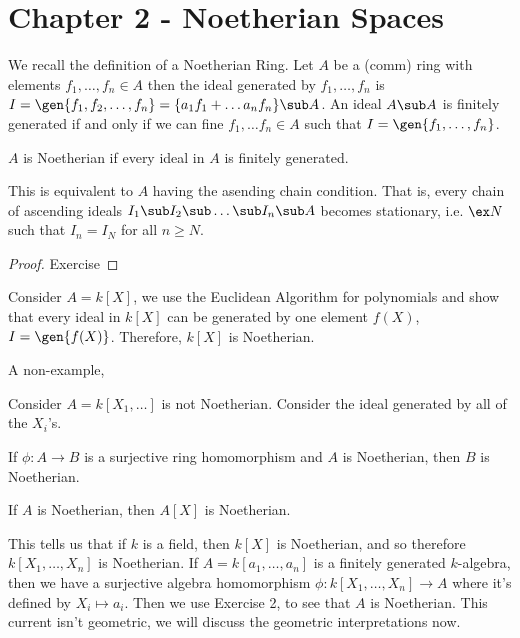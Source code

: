 
\section{Chapter 2 - Noetherian Spaces}
We recall the definition of a Noetherian Ring. Let $A$ be a (comm) ring with elements $f_1, \dots, f_n \in A$ then the ideal generated by $f_1, \dots, f_n$ is $I = \gen{ f_1, f_2, \dots, f_n} = \{a_1f_1 + \dots a_nf_n\} \sub A$. An ideal $A \sub A$ is finitely generated if and only if we can fine $f_1, \dots f_n \in A$ such that $I = \gen{f_1, \dots, f_n}$.
\begin{ndefi}
  $A$ is Noetherian if every ideal in $A$ is finitely generated.
\end{ndefi}

\noindent
This is equivalent to $A$ having the asending chain condition. That is, every chain of ascending ideals $I_1 \sub I_2 \sub \dots \sub I_n \sub A$ becomes stationary, i.e. $\ex N$ such that $I_n = I_N$ for all $n \ge N$.
\begin{proof}
  Exercise
\end{proof}

\begin{eg}
  Consider $A = k[X]$, we use the Euclidean Algorithm for polynomials and show that every ideal in $k[X]$ can be generated by one element $f(X)$, $I = \gen{f(X)}$. Therefore, $k[X]$ is Noetherian.
\end{eg}

\noindent
A non-example,
\begin{eg}
  Consider $A = k[X_1, \dots]$ is not Noetherian. Consider the ideal generated by all of the $X_i$'s.
\end{eg}

\begin{exercise}
  If $\phi : A \to B$ is a surjective ring homomorphism and $A$ is Noetherian, then $B$ is Noetherian.
\end{exercise}

\begin{nthm}
  If $A$ is Noetherian, then $A[X]$ is Noetherian.
\end{nthm}
\noindent
This tells us that if $k$ is a field, then $k[X]$ is Noetherian, and so therefore $k[X_1, \dots, X_n]$ is Noetherian. If $A = k[a_1, \dots, a_n]$ is a finitely generated $k$-algebra, then we have a surjective algebra homomorphism $\phi : k[X_1, \dots, X_n] \to A$ where it's defined by $X_i \mapsto a_i$. Then we use Exercise 2, to see that $A$ is Noetherian. This current isn't geometric, we will discuss the geometric interpretations now.\\


